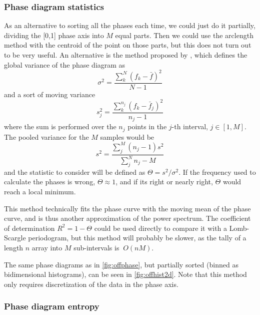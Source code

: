 	
	\subsubsection{Phase diagram statistics}
	
	As an alternative to sorting all the phases each time, we could just do it partially,
	dividing the [0,1] phase axis into $M$ equal parts. 
	Then we could use the arclength method with the centroid of the point on those parts, but this does not turn out to be very useful.
	An alternative is the method proposed by \cite{Stellingwerf1978}, which defines the global variance of the phase diagram as
	\begin{equation}
		\sigma^2 = \frac{\sum_k^N (f_k - \bar{f})^2}{N-1}
	\end{equation}
	and a sort of moving variance
	\begin{equation}
		s_j^2 = \frac{\sum_k^{n_j} (f_k-\bar{f}_j)^2}{n_j-1}
	\end{equation}
	where the sum is performed over the $n_j$ points in the $j$-th interval, $j\in[1,M]$.
	The pooled variance for the $M$ samples would be 
	\begin{equation}
		s^2 = \frac{\sum_j^M (n_j-1)s^2}{\sum_j^N n_j -M} \label{eq:pooled-variance}
	\end{equation}
	and the statistic to consider will be defined as $\Theta=s^2/\sigma^2$. 
	If the frequency used to calculate the phases is wrong, $\Theta\approx 1$, and if its right or nearly right, 
	$\Theta$ would reach a local minimum.
	
	This method technically fits the phase curve with the moving mean of the phase curve, and is thus another approximation of the power spectrum.
	The coefficient of determination $R^2=1-\Theta$ could be used directly to compare it with a Lomb-Scargle periodogram, but this method will probably be slower,
	as the tally of a length $n$ array into $M$ sub-intervals is $~O(nM)$.
	
	The same phase diagrams as in \autoref{fig:offphase}, 
	but partially sorted (binned as bidimensional histograms), can be seen in \autoref{fig:offhist2d}.
	Note that this method only requires discretization of the data in the phase axis.
	
	
	\subsubsection{Phase diagram entropy}
	
